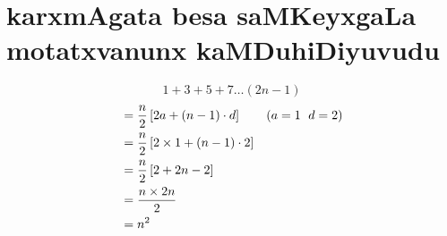 \chapter{karxmAgata besa saMKeyxgaLa motatxvanunx kaMDuhiDiyuvudu}

$$
1+3+5+7\ldots(2n-1)
$$
\begin{align*}
&=\frac{n}{2}\left[2a+(n-1)\cdot d\right] \qquad \text{($a = 1$\; $d=2$)}\\
&=\frac{n}{2}\left[2\times 1 +(n-1)\cdot 2\right]\\
&=\frac{n}{2}\left[2+2n-2\right]\\
&=\frac{{n \times 2n}}{2}\\
&=n^2
\end{align*}
